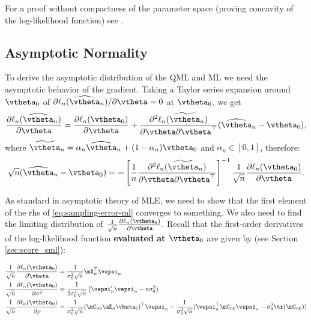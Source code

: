 \documentclass[english,12pt]{book}\usepackage[]{graphicx}\usepackage[]{xcolor}
\begin{document}
For a proof without compactness of the parameter space (proving concavity of the log-likelihood function) see \cite{liu2022consistency}.

\subsection{Asymptotic Normality}

To derive the asymptotic distribution of the QML and ML we need the asymptotic behavior of the gradient. Taking a Taylor series expansion around $\vtheta_0$ of $\partial \ell_n(\widehat{\vtheta}_n)/ \partial \vtheta = 0$ at $\vtheta_0$, we get
\begin{equation}
  \frac{\partial \ell_n(\widehat{\vtheta}_n)}{\partial \vtheta} =  \frac{\partial \ell_n(\vtheta_0)}{\partial \vtheta} + \frac{\partial^2 \ell_n(\widetilde{\vtheta}_n)}{\partial \vtheta \partial \vtheta^\top}(\widehat{\vtheta}_n - \vtheta_0),
\end{equation}
%
where $\widetilde{\vtheta}_n = \alpha_n \widehat{\vtheta}_n + (1 - \alpha_n)\vtheta_0$ and $\alpha_n\in \left[ 0, 1\right]$, therefore:
\begin{equation}\label{eq:sampling-error-ml}
  \sqrt{n}(\widehat{\vtheta}_n - \vtheta_0) = - \left[\frac{1}{n}\frac{\partial^2 \ell_n(\widetilde{\vtheta}_n)}{\partial \vtheta \partial \vtheta^\top}\right]^{-1}\frac{1}{\sqrt{n}}\frac{\partial \ell_n(\vtheta_0)}{\partial \vtheta}.
\end{equation}

As standard in asymptotic theory of MLE, we need to show that the first element of the rhs of \eqref{eq:sampling-error-ml} converges to something. We also need to find the limiting distribution of $\frac{1}{\sqrt{n}}\frac{\partial \ell_n(\vtheta_0)}{\partial \vtheta}$. Recall that the first-order derivatives of the log-likelihood function \textbf{evaluated at $\vtheta_0$} are given by (see Section \ref{sec:score_sml}):

\begin{align}
	\frac{1}{\sqrt{n}}\frac{\partial \ell_n(\vtheta_0)}{\partial \vbeta} & = \frac{1}{\sigma^2_0\sqrt{n}}\mX_n^\top\vepsi_n \\
	\frac{1}{\sqrt{n}}\frac{\partial \ell_n(\vtheta_0)}{\partial \sigma^2} & = \frac{1}{2\sigma_0^4\sqrt{n}}\left(\vepsi_n'\vepsi_n - n\sigma_0^2\right) \\
		\frac{1}{\sqrt{n}}\frac{\partial \ell_n(\vtheta_0)}{\partial \rho} & = \frac{1}{\sigma_0^2\sqrt{n}}(\mC_{n0}\mX_n\vbeta_0)^\top \vepsi_n + \frac{1}{\sigma_0^2\sqrt{n}}(\vepsi_n^\top\mC_{n0}\vepsi_n - \sigma_0^2\tr(\mC_{n0}))\label{eq:asy_der_rho}
\end{align}	
\end{document}

